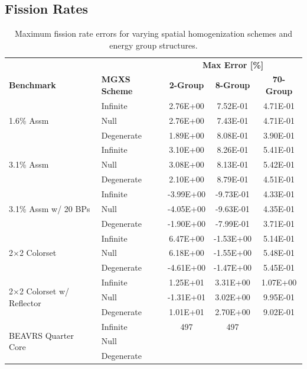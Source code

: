 \subsection{Fission Rates}
\label{subsec:chap8-fiss-rates}

\begin{table}[h!]
  \centering
  \caption[Maximum OpenMOC fission rate errors]{Maximum fission rate errors for varying spatial homogenization schemes and energy group structures.}
  \small
  \label{table:chap8-openmoc-max-fiss-rates}
  \vspace{6pt}
  \begin{tabular}{l l c c c}
  \toprule
  \rowcolor{lightgray}
  & & \multicolumn{3}{c}{\cellcolor{lightgray} \textbf{Max Error [\%]}} \\
  \multirow{-2}{*}{\cellcolor{lightgray} \bf Benchmark} &
  \multirow{-2}{*}{\cellcolor{lightgray} \bf \ac{MGXS} Scheme} &
  \multicolumn{1}{c}{{\cellcolor{lightgray} \bf 2-Group}} &
  \multicolumn{1}{c}{{\cellcolor{lightgray} \bf 8-Group}} &
  \multicolumn{1}{c}{{\cellcolor{lightgray} \bf 70-Group}} \\
  \midrule
\multirow{3}{*}{\parbox{2.5cm}{1.6\% Assm}} & Infinite & 2.76E+00 & 7.52E-01 & 4.71E-01 \\
& Null & 2.76E+00 & 7.43E-01 & 4.71E-01 \\
& Degenerate & 1.89E+00 & 8.08E-01 & 3.90E-01 \\
  \midrule
\multirow{3}{*}{\parbox{2.5cm}{3.1\% Assm}} & Infinite & 3.10E+00 & 8.26E-01 & 5.41E-01 \\
& Null & 3.08E+00 & 8.13E-01 & 5.42E-01 \\
& Degenerate & 2.10E+00 & 8.79E-01 & 4.51E-01 \\
  \midrule
\multirow{3}{*}{\parbox{2.5cm}{3.1\% Assm w/ 20 BPs}} & Infinite & -3.99E+00 & -9.73E-01 & 4.33E-01 \\
& Null & -4.05E+00 & -9.63E-01 & 4.35E-01 \\
& Degenerate & -1.90E+00 & -7.99E-01 & 3.71E-01 \\
  \midrule
\multirow{3}{*}{\parbox{2.5cm}{2$\times$2 Colorset}} & Infinite & 6.47E+00 & -1.53E+00 & 5.14E-01 \\
& Null & 6.18E+00 & -1.55E+00 & 5.48E-01 \\
& Degenerate & -4.61E+00 & -1.47E+00 & 5.45E-01 \\
  \midrule
\multirow{3}{*}{\parbox{2.5cm}{2$\times$2 Colorset w/ Reflector}} & Infinite & 1.25E+01 & 3.31E+00 & 1.07E+00 \\
& Null & -1.31E+01 & 3.02E+00 & 9.95E-01 \\
& Degenerate & 1.01E+01 & 2.70E+00 & 9.02E-01 \\
  \midrule
  \multirow{3}{*}{\parbox{2cm}{\ac{BEAVRS} Quarter Core}} & Infinite & 497 & 497 & \\
  & Null & & & \\
  & Degenerate & & & \\
  \bottomrule
\end{tabular}
\end{table}

